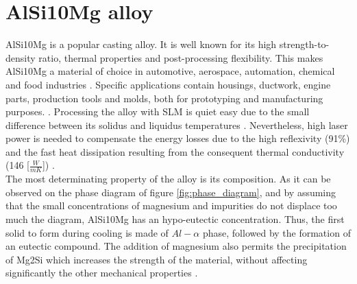 \section{AlSi10Mg alloy}

AlSi10Mg is a popular casting alloy. It is well known for its high strength-to-density ratio, thermal properties and post-processing flexibility. This makes AlSi10Mg a material of choice in automotive, aerospace, automation, chemical and food industries \parencite{Kempen110817}. Specific applications contain housings, ductwork, engine parts, production tools and molds, both for prototyping and manufacturing purposes. \parencite{Alu}. Processing the alloy with SLM is quiet easy due to the small difference between its solidus and liquidus temperatures \parencite{Kempen110817}. Nevertheless, high laser power is needed to compensate the energy losses due to the high reflexivity (91\%) and the fast heat dissipation resulting from the consequent thermal conductivity (146 [$\frac{W}{mK}$]) \parencite{aboulkhair2016}.\\

%

The most determinating property of the alloy is its composition. As it can be observed on the phase diagram of figure \ref{fig:phase_diagram}, and by assuming that the small concentrations of magnesium and impurities do not displace too much the diagram, AlSi10Mg has an hypo-eutectic concentration. Thus, the first solid to form during cooling is made of $Al-\alpha$ phase, followed by the formation of an eutectic compound. The addition of magnesium also permits the precipitation of Mg2Si which increases the strength of the material, without affecting significantly the other mechanical properties \parencite{Kempen110817}.\\

